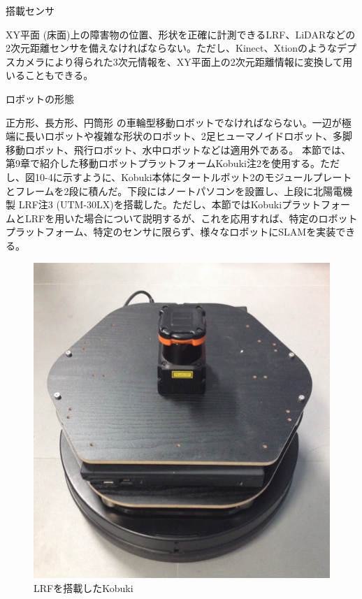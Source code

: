 \circled{\thenum} 搭載センサ

XY平面 (床面)上の障害物の位置、形状を正確に計測できるLRF、LiDARなどの2次元距離センサを備えなければならない。ただし、Kinect、Xtionのようなデプスカメラにより得られた3次元情報を、XY平面上の2次元距離情報に変換して用いることもできる。

\circled{\thenum} ロボットの形態

正方形、長方形、円筒形 の車輪型移動ロボットでなければならない。一辺が極端に長いロボットや複雑な形状のロボット、2足ヒューマノイドロボット、多脚移動ロボット、飛行ロボット、水中ロボットなどは適用外である。
本節では、第9章で紹介した移動ロボットプラットフォームKobuki注2を使用する。ただし、図10-4に示すように、Kobuki本体にタートルボット2のモジュールプレートとフレームを2段に積んだ。下段にはノートパソコンを設置し、上段に北陽電機製 LRF注3  (UTM-30LX)を搭載した。ただし、本節ではKobukiプラットフォームとLRFを用いた場合について説明するが、これを応用すれば、特定のロボットプラットフォーム、特定のセンサに限らず、様々なロボットにSLAMを実装できる。

\begin{figure}[ht]
  \centering
  \includegraphics[width=\columnwidth]{pictures/chapter10/pic_10_04.png}
  \caption{LRFを搭載したKobuki}
\end{figure}

